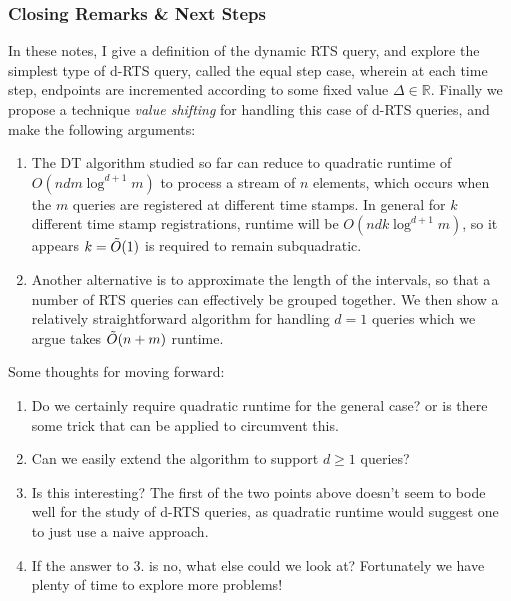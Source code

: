\documentclass{article}
\begin{document}
\subsubsection*{Closing Remarks \& Next Steps}
In these notes, I give a definition of the dynamic RTS query, and explore the simplest type of d-RTS query, called the equal step case, wherein at each time step, endpoints are incremented according to some fixed value $\Delta \in\mathbb{R}$. Finally we propose a technique \textit{value shifting} for handling this case of d-RTS queries, and make the following arguments: 
\begin{enumerate}
    \item The DT algorithm studied so far can reduce to quadratic runtime of $O(ndm\log^{d+1}m)$ to process a stream of $n$ elements, which occurs when the $m$ queries are registered at different time stamps. In general for $k$ different time stamp registrations, runtime will be $O(ndk\log^{d+1}m)$, so it appears $k = \Tilde{O}(1)$ is required to remain subquadratic.
    \item Another alternative is to approximate the length of the intervals, so that a number of RTS queries can effectively be grouped together. We then show a relatively straightforward algorithm for handling $d=1$ queries which we argue takes $\Tilde{O}(n+m)$ runtime.
\end{enumerate}
Some thoughts for moving forward: 
\begin{enumerate}
    \item Do we certainly require quadratic runtime for the general case? or is there some trick that can be applied to circumvent this. 
    \item Can we easily extend the algorithm to support $d\geq1$ queries? 
    \item Is this interesting? The first of the two points above doesn't seem to bode well for the study of d-RTS queries, as quadratic runtime would suggest one to just use a naive approach. 
    \item If the answer to 3. is no, what else could we look at? Fortunately we have plenty of time to explore more problems! 
\end{enumerate}
\end{document}
